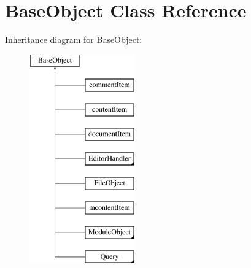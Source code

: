 \hypertarget{classBaseObject}{\section{Base\-Object Class Reference}
\label{classBaseObject}
}
Inheritance diagram for Base\-Object\-:\begin{figure}[H]
\begin{center}
\leavevmode
\includegraphics[height=9.000000cm]{classBaseObject}
\end{center}
\end{figure}

